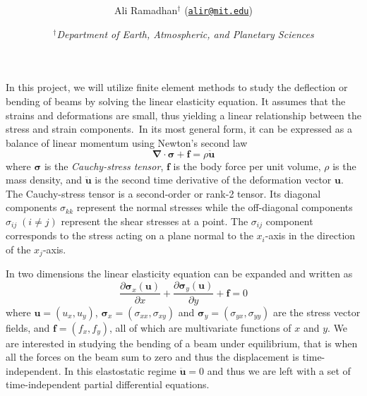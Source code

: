\documentclass[11pt]{article}
\title{\spacedlowsmallcaps{6.339: Numerical Methods for Partial Differential Equations}\\ \spacedlowsmallcaps{Project three: Finite Element Methods}}
\author{Ali Ramadhan$^\text{†}$ (\href{mailto:alir@mit.edu}{\texttt{alir@mit.edu}})}
\date{\textit{$^\text{†}$Department of Earth, Atmospheric, and Planetary Sciences}}
\newcommand\p[2]{\frac{\partial #1}{\partial #2}}
\begin{document}
\maketitle

In this project, we will utilize finite element methods to study the deflection or bending of beams by solving the linear elasticity equation. It assumes that the strains and deformations are small, thus yielding a linear relationship between the stress and strain components.\footnotemark~In its most general form, it can be expressed as a balance of linear momentum using Newton's second law
\begin{equation*} \label{eq:linElasGen}
  \bm{\nabla\cdot\sigma + f} = \rho\ddot{\bm{u}}
\end{equation*}
where $\bm{\sigma}$ is the \emph{Cauchy-stress tensor}, $\bm{f}$ is the body force per unit volume, $\rho$ is the mass density, and $\ddot{\bm{u}}$ is the second time derivative of the deformation vector $\bm{u}$. The Cauchy-stress tensor is a second-order or rank-2 tensor. Its diagonal components $\sigma_{kk}$ represent the normal stresses while the off-diagonal components $\sigma_{ij} \; (i \ne j)$  represent the shear stresses at a point. The $\sigma_{ij}$ component corresponds to the stress acting on a plane normal to the $x_i$-axis in the direction of the $x_j$-axis.


In two dimensions the linear elasticity equation can be expanded and written as
\begin{equation} \label{eq:linElas}
  \p{\bm{\sigma}_x(\bm{u})}{x} + \p{\bm{\sigma}_y(\bm{u})}{y} + \bm{f} = 0
\end{equation}
where $\bm{u} = (u_x, u_y)$, $\bm{\sigma}_x = (\sigma_{xx}, \sigma_{xy})$ and $\bm{\sigma}_y = (\sigma_{yx}, \sigma_{yy})$ are the stress vector fields, and $\bm{f} = (f_x, f_y)$, all of which are multivariate functions of $x$ and $y$. We are interested in studying the bending of a beam under equilibrium, that is when all the forces on the beam sum to zero and thus the displacement is time-independent. In this elastostatic regime $\ddot{\bm{u}} = 0$ and thus we are left with a set of time-independent partial differential equations.
\end{document}
